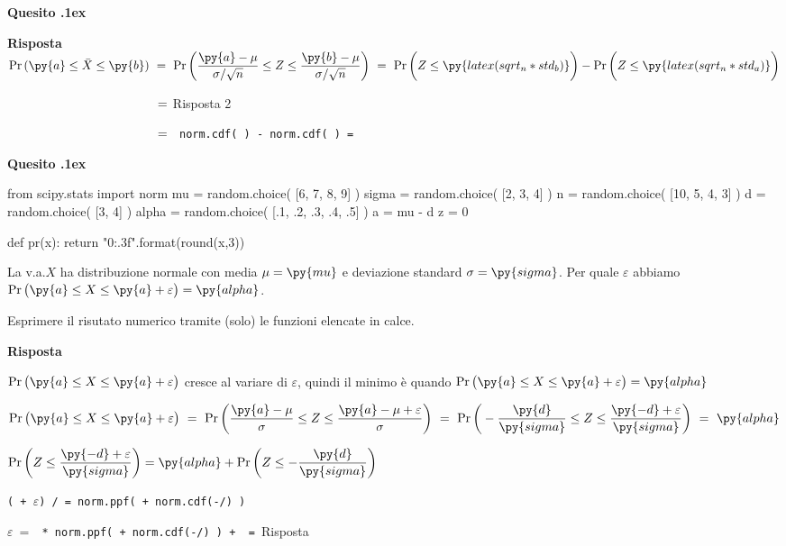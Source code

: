 \documentclass[11pt,twoside,a4paper]{article}
\def\Pr{{\rm Pr\,}}
\newcounter{quesito}
\newenvironment{question}{\addtocounter{quesito}{1}\bigskip\bigskip\par\textbf{Quesito \thequesito.\kern1ex}}{\vspace{\parskip}}
\newenvironment{answer}{\par\textbf{Risposta\quad}}{\vspace{\parskip}}
\begin{document}
\begin{question}
\begin{answer}
$\displaystyle \Pr(\py{a}\le\bar X\le\py{b})
\ =\ 
\Pr\bigg(\dfrac{\py{a}-\mu}{\sigma/\sqrt{n}}\le Z\le\dfrac{\py{b}-\mu}{\sigma/\sqrt{n}}\bigg)\ =\  \Pr\bigg(Z\le\py{latex(sqrt_n*std_b)}\bigg) -  \Pr\bigg(Z\le\py{latex(sqrt_n*std_a)}\bigg)$

$\phantom{\Pr\py{a}\le\bar X\le\py{b})}
\ =\ 
${\hfill Risposta 2}

$\phantom{\Pr\py{a}\le\bar X\le\py{b})}
\ =\ 
${\tt\ norm.cdf(  ) -  norm.cdf(  )
= 
}

\end{answer}
\end{question}


\begin{question} 
\begin{pycode}
from scipy.stats import norm
mu    = random.choice( [6, 7, 8, 9] )
sigma = random.choice( [2, 3, 4] )
n     = random.choice( [10, 5, 4, 3] )
d     = random.choice( [3, 4] )
alpha = random.choice( [.1, .2, .3, .4, .5] )
a = mu - d 
z = 0

def pr(x):
    return "{0:.3f}".format(round(x,3))
\end{pycode}
La v.a.\@ $X$ ha distribuzione normale con media $\mu=\py{mu}$ e deviazione standard $\sigma=\py{sigma}$. 
Per quale $\varepsilon$ abbiamo $\Pr\big(\py{a}\le X\le\py{a}+\varepsilon\big)=\py{alpha}$.

Esprimere il risutato numerico tramite (solo) le funzioni elencate in calce. 
\begin{answer}

$\Pr\big(\py{a}\le X\le\py{a}+\varepsilon\big)$ cresce al variare di $\varepsilon$, quindi il minimo è quando $\Pr\big(\py{a}\le X\le\py{a}+\varepsilon\big)=\py{alpha}$\medskip

$\Pr\big(\py{a}\le X\le\py{a}+\varepsilon\big)
\ =\ 
\Pr\bigg(\dfrac{\py{a}-\mu}{\sigma}\le Z\le\dfrac{\py{a}-\mu+\varepsilon}{\sigma}\bigg)
\ =\ 
\Pr\bigg(-\dfrac{\py{d}}{\py{sigma}}\le Z\le\dfrac{\py{-d}+\varepsilon}{\py{sigma}}\bigg)\ =\ \py{alpha}$

$\Pr\bigg(Z\le\dfrac{\py{-d}+\varepsilon}{\py{sigma}}\bigg) = \py{alpha}+\Pr\bigg(Z\le-\dfrac{\py{d}}{\py{sigma}}\bigg)$\medskip

{\tt( + $\varepsilon$) /  = norm.ppf(  + norm.cdf(-/) ) }\medskip

$\varepsilon\ =\ ${\color{blue}\tt  {} * norm.ppf(  + norm.cdf(-/) ) +  }{\tt\ =\ }{\color{blue}\hfill Risposta}

\end{answer}
\end{question}
\end{document}
